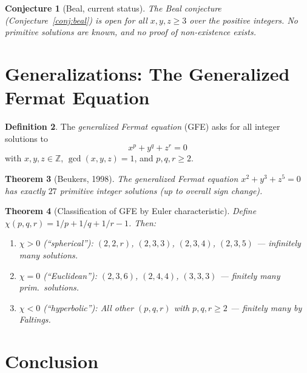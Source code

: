 \documentclass[12pt,a4paper]{amsart}
\newtheorem{theorem}{Theorem}[section]
\newtheorem{conjecture}[theorem]{Conjecture}
\theoremstyle{definition}
\newtheorem{definition}[theorem]{Definition}
\theoremstyle{remark}
\begin{document}
\begin{conjecture}[Beal, current status]\label{conj:beal_status}
The Beal conjecture (Conjecture~\ref{conj:beal}) is open for all $x, y, z \geq 3$
over the positive integers. No primitive solutions are known, and no proof of
non-existence exists.
\end{conjecture}

\section{Generalizations: The Generalized Fermat Equation}

\begin{definition}
The \emph{generalized Fermat equation} (GFE) asks for all integer solutions to
\[
  x^p + y^q + z^r = 0
\]
with $x, y, z \in \mathbb{Z}$, $\gcd(x,y,z) = 1$, and $p, q, r \geq 2$.
\end{definition}

\begin{theorem}[Beukers, 1998]\label{thm:beukers}
The generalized Fermat equation $x^2 + y^3 + z^5 = 0$ has exactly $27$ primitive
integer solutions (up to overall sign change).
\end{theorem}

\begin{theorem}[Classification of GFE by Euler characteristic]\label{thm:euler}
Define $\chi(p,q,r) = 1/p + 1/q + 1/r - 1$. Then:
\begin{enumerate}[label=(\roman*)]
  \item $\chi > 0$ (``spherical''): $(2,2,r)$, $(2,3,3)$, $(2,3,4)$, $(2,3,5)$ — infinitely many solutions.
  \item $\chi = 0$ (``Euclidean''): $(2,3,6)$, $(2,4,4)$, $(3,3,3)$ — finitely many prim.\ solutions.
  \item $\chi < 0$ (``hyperbolic''): All other $(p,q,r)$ with $p,q,r \geq 2$ — finitely many by Faltings.
\end{enumerate}
\end{theorem}

\section{Conclusion}
\end{document}
